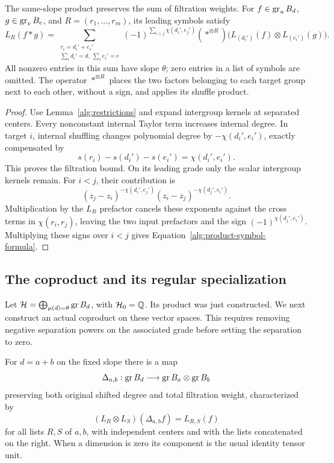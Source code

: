 \begin{lemma}\label{alg:product-symbol}
The same-slope product preserves the sum of filtration weights.
For $f\in\operatorname{gr}_uB_d$, $g\in\operatorname{gr}_vB_e$, and
$R=(r_1,\ldots,r_m)$, its leading symbols satisfy
\begin{equation}\label{alg:product-symbol-formula}
 L_R(f*g)=
 \sum_{\substack{r_i=d_i'+e_i'\\
                  \sum_i d_i'=d,\ \sum_i e_i'=e}}
 (-1)^{\sum_{i>j}\chi(d_i',e_j')}
 (*^{\otimes R})
 \bigl(L_{(d_i')}(f)\otimes L_{(e_i')}(g)\bigr).
\end{equation}
All nonzero entries in this sum have slope $\theta$; zero entries in
a list of symbols are omitted.  The operator $*^{\otimes R}$ places
the two factors belonging to each target group next to each other,
without a sign, and applies its shuffle product.
\end{lemma}

\begin{proof}
Use Lemma~\ref{alg:restrictions} and expand intergroup kernels at
separated centers.  Every nonconstant internal Taylor term increases
internal degree.  In target $i$, internal shuffling changes
polynomial degree by $-\chi(d_i',e_i')$, exactly compensated by
\[
 s(r_i)-s(d_i')-s(e_i')=\chi(d_i',e_i').
\]
This proves the filtration bound.  On its leading grade only the
scalar intergroup kernels remain.  For $i<j$, their contribution is
\[
 (z_j-z_i)^{-\chi(d_i',e_j')}
 (z_i-z_j)^{-\chi(d_j',e_i')}.
\]
Multiplication by the $L_R$ prefactor cancels these exponents against
the cross terms in $\chi(r_i,r_j)$, leaving the two input prefactors
and the sign $(-1)^{\chi(d_j',e_i')}$.  Multiplying these signs over
$i<j$ gives Equation~\eqref{alg:product-symbol-formula}.
\end{proof}

\subsection{The coproduct and its regular specialization}

Let $\mathcal H=\bigoplus_{\mu(d)=\theta}\operatorname{gr} B_d$, with
$\mathcal H_0=\mathbb Q$.  Its product was just constructed.  We next
construct an actual coproduct on these vector spaces.  This requires
removing negative separation powers on the associated grade before
setting the separation to zero.

\begin{lemma}\label{alg:coproduct}
For $d=a+b$ on the fixed slope there is a map
\[
 \Delta_{a,b}:\operatorname{gr} B_d\longrightarrow\operatorname{gr} B_a\otimes\operatorname{gr} B_b
\]
preserving both original shifted degree and total filtration weight,
characterized by
\begin{equation}\label{alg:coproduct-symbol}
 (L_R\otimes L_S)(\Delta_{a,b}f)=L_{R,S}(f)
\end{equation}
for all lists $R,S$ of $a,b$, with independent centers and with the
lists concatenated on the right.  When a dimension is zero its
component is the usual identity tensor unit.
\end{lemma}

